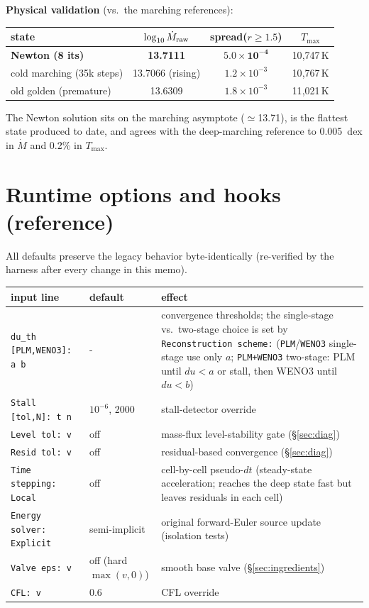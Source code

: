\documentclass[english,a4paper]{my_memo}
\newcommand{\code}[1]{\texttt{#1}}
\begin{document}
\textbf{Physical validation} (vs.\ the marching references):

\begin{center}
\begin{tabular}{lccc}
\toprule
state & $\log_{10}\dot M_{\rm raw}$ & spread($r\!\ge\!1.5$) & $T_{\max}$\\
\midrule
\textbf{Newton (8 its)} & \textbf{13.7111} & $\mathbf{5.0\times10^{-4}}$ &
 10{,}747\,K\\
cold marching (35k steps) & 13.7066 (rising) & $1.2\times10^{-3}$ &
 10{,}767\,K\\
old golden (premature) & 13.6309 & $1.8\times10^{-3}$ & 11{,}021\,K\\
\bottomrule
\end{tabular}
\end{center}

The Newton solution sits on the marching asymptote ($\simeq$13.71), is the
flattest state produced to date, and agrees with the deep-marching
reference to 0.005~dex in $\dot M$ and 0.2\% in $T_{\max}$.

\section{Runtime options and hooks (reference)}\label{sec:options}

All defaults preserve the legacy behavior byte-identically (re-verified by
the harness after every change in this memo).

\begin{center}\small
\begin{tabular}{llp{}}
\toprule
input line & default & effect\\
\midrule
\code{du\_th [PLM,WENO3]: a b} & - & convergence thresholds; the
 single-stage vs.\ two-stage choice is set by \code{Reconstruction scheme:}
 (\code{PLM}/\code{WENO3} single-stage use only $a$; \code{PLM+WENO3}
 two-stage: PLM until $du<a$ or stall, then WENO3 until $du<b$)\\
\code{Stall [tol,N]: t n} & $10^{-6}$, 2000 & stall-detector override\\
\code{Level tol: v} & off & mass-flux level-stability gate
 (\S\ref{sec:diag})\\
\code{Resid tol: v} & off & residual-based convergence
 (\S\ref{sec:diag})\\
\code{Time stepping: Local} & off & cell-by-cell pseudo-$dt$ (steady-state
 acceleration; reaches the deep state fast but leaves residuals in each cell)\\
\code{Energy solver: Explicit} & semi-implicit & original forward-Euler
 source update (isolation tests)\\
\code{Valve eps: v} & off (hard $\max(v,0)$) & smooth base valve
 (\S\ref{sec:ingredients})\\
\code{CFL: v} & 0.6 & CFL override\\
\bottomrule
\end{tabular}
\end{center}
\end{document}
